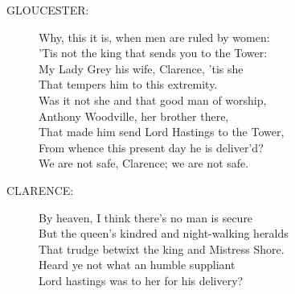 \documentclass{article}
\begin{document}
\begin{description}
\item[GLOUCESTER:] 
\hspace{1pt}Why, this it is, when men are ruled by women:\\
\hspace{1pt}'Tis not the king that sends you to the Tower:\\
\hspace{1pt}My Lady Grey his wife, Clarence, 'tis she\\
\hspace{1pt}That tempers him to this extremity.\\
\hspace{1pt}Was it not she and that good man of worship,\\
\hspace{1pt}Anthony Woodville, her brother there,\\
\hspace{1pt}That made him send Lord Hastings to the Tower,\\
\hspace{1pt}From whence this present day he is deliver'd?\\
\hspace{1pt}We are not safe, Clarence; we are not safe.\\
\end{description}
\begin{description}
\item[CLARENCE:] 
\hspace{1pt}By heaven, I think there's no man is secure\\
\hspace{1pt}But the queen's kindred and night-walking heralds\\
\hspace{1pt}That trudge betwixt the king and Mistress Shore.\\
\hspace{1pt}Heard ye not what an humble suppliant\\
\hspace{1pt}Lord hastings was to her for his delivery?\\
\end{description}
\end{document}
